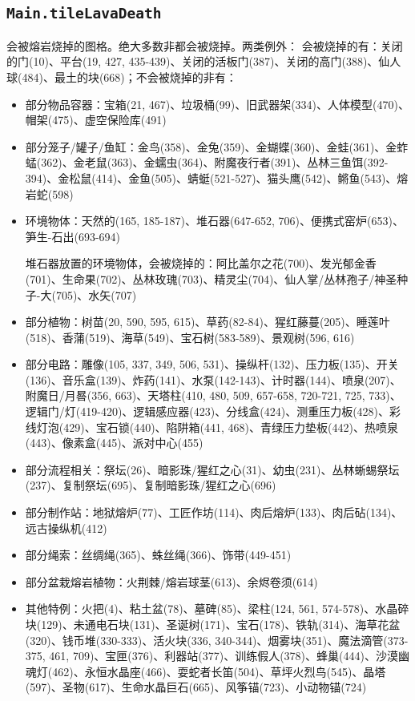 \subsection{\texttt{Main.tileLavaDeath}}\label{src:tileLavaDeath}
会被熔岩烧掉的图格。绝大多数非都会被烧掉。两类例外：
会被烧掉的有：关闭的门(10)、平台(19, 427, 435-439)、关闭的活板门(387)、关闭的高门(388)、仙人球(484)、最土的块(668)；不会被烧掉的非有：
\begin{itemize}
  \item 部分物品容器：宝箱(21, 467)、垃圾桶(99)、旧武器架(334)、人体模型(470)、帽架(475)、虚空保险库(491)
  \item 部分笼子/罐子/鱼缸：金鸟(358)、金兔(359)、金蝴蝶(360)、金蛙(361)、金蚱蜢(362)、金老鼠(363)、金蠕虫(364)、附魔夜行者(391)、丛林三鱼饵(392-394)、金松鼠(414)、金鱼(505)、蜻蜓(521-527)、猫头鹰(542)、鳉鱼(543)、熔岩蛇(598)
  \item 环境物体：天然的(165, 185-187)、堆石器(647-652, 706)、便携式窑炉(653)、笋生-石出(693-694)

        堆石器放置的环境物体，会被烧掉的：阿比盖尔之花(700)、发光郁金香(701)、生命果(702)、丛林玫瑰(703)、精灵尘(704)、仙人掌/丛林孢子/神圣种子-大(705)、水矢(707)
  \item 部分植物：树苗(20, 590, 595, 615)、草药(82-84)、猩红藤蔓(205)、睡莲叶(518)、香蒲(519)、海草(549)、宝石树(583-589)、景观树(596, 616)
  \item 部分电路：雕像(105, 337, 349, 506, 531)、操纵杆(132)、压力板(135)、开关(136)、音乐盒(139)、炸药(141)、水泵(142-143)、计时器(144)、喷泉(207)、附魔日/月晷(356, 663)、天塔柱(410, 480, 509, 657-658, 720-721, 725, 733)、逻辑门/灯(419-420)、逻辑感应器(423)、分线盒(424)、测重压力板(428)、彩线灯泡(429)、宝石锁(440)、陷阱箱(441, 468)、青绿压力垫板(442)、热喷泉(443)、像素盒(445)、派对中心(455)
  \item 部分流程相关：祭坛(26)、暗影珠/猩红之心(31)、幼虫(231)、丛林蜥蜴祭坛(237)、复制祭坛(695)、复制暗影珠/猩红之心(696)
  \item 部分制作站：地狱熔炉(77)、工匠作坊(114)、肉后熔炉(133)、肉后砧(134)、远古操纵机(412)
  \item 部分绳索：丝绸绳(365)、蛛丝绳(366)、饰带(449-451)
  \item 部分盆栽熔岩植物：火荆棘/熔岩球茎(613)、余烬卷须(614)
  \item 其他特例：火把(4)、粘土盆(78)、墓碑(85)、梁柱(124, 561, 574-578)、水晶碎块(129)、未通电石块(131)、圣诞树(171)、宝石(178)、铁轨(314)、海草花盆(320)、钱币堆(330-333)、活火块(336, 340-344)、烟雾块(351)、魔法滴管(373-375, 461, 709)、宝匣(376)、利器站(377)、训练假人(378)、蜂巢(444)、沙漠幽魂灯(462)、永恒水晶座(466)、耍蛇者长笛(504)、草坪火烈鸟(545)、晶塔(597)、圣物(617)、生命水晶巨石(665)、风筝锚(723)、小动物锚(724)
\end{itemize}

